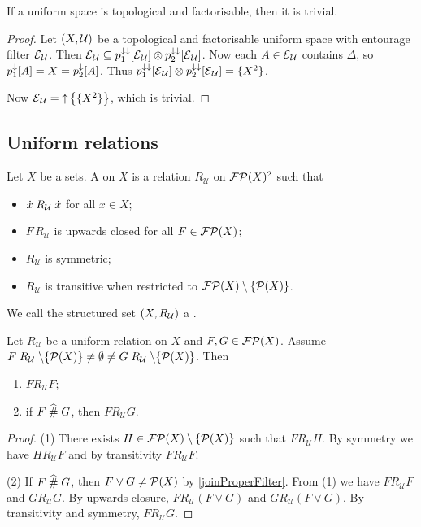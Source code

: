 \begin{proposition}
If a uniform space is topological and factorisable, then it is trivial.
\end{proposition}
\begin{proof}
Let $\left( X,\mathcal{U} \right)$ be a topological and factorisable uniform space with entourage filter $\operatorname{\mathcal{E}}_\mathcal{U}$. Then $\operatorname{\mathcal{E}}_\mathcal{U} \subseteq p_1^{\downarrow\downarrow}[\operatorname{\mathcal{E}}_\mathcal{U}]\otimes p_2^{\downarrow\downarrow}[\operatorname{\mathcal{E}}_\mathcal{U}]$. Now each $A\in \operatorname{\mathcal{E}}_\mathcal{U}$ contains $\Delta$, so $p_1^\downarrow[A] = X = p_2^\downarrow[A]$. Thus $p_1^{\downarrow\downarrow}[\operatorname{\mathcal{E}}_\mathcal{U}]\otimes p_2^{\downarrow\downarrow}[\operatorname{\mathcal{E}}_\mathcal{U}] = \{X^2\}$.

Now $\operatorname{\mathcal{E}}_\mathcal{U} = \operatorname{\uparrow}\big\{\{X^2\}\big\}$, which is trivial.
\end{proof}

\subsection{Uniform relations}
\begin{definition}
Let $X$ be a sets. A  on $X$ is a relation $R_\mathcal{U}$ on $\operatorname{\mathcal{FP}}(X)^2$ such that
\begin{itemize}
\item $\dot{x}\mathrel{R_\mathcal{U}}\dot{x}$ for all $x\in X$;
\item $F\,R_\mathcal{U}$ is upwards closed for all $F\in \operatorname{\mathcal{FP}}(X)$;
\item $R_\mathcal{U}$ is symmetric;
\item $R_\mathcal{U}$ is transitive when restricted to $\operatorname{\mathcal{FP}}(X)\setminus\{\operatorname{\mathcal{P}}(X)\}$.
\end{itemize}
We call the structured set $\left( X,R_\mathcal{U} \right)$ a .
\end{definition}

\begin{lemma} \label{uniformRelationRelatedElementLemma}
Let $R_\mathcal{U}$ be a uniform relation on $X$ and $F,G\in\operatorname{\mathcal{FP}}(X)$. Assume $F\mathrel{R_\mathcal{U}}\setminus\{\operatorname{\mathcal{P}}(X)\} \neq \emptyset \neq G\mathrel{R_\mathcal{U}}\setminus\{\operatorname{\mathcal{P}}(X)\}$. Then
\begin{enumerate}
\item $F\mathrel{R_\mathcal{U}} F$;
\item if $F\mathrel{\widehat{\#}} G$, then $F\mathrel{R_\mathcal{U}} G$.
\end{enumerate}
\end{lemma}
\begin{proof}
(1) There exists $H\in\operatorname{\mathcal{FP}}(X)\setminus\{\operatorname{\mathcal{P}}(X)\}$ such that $F\mathrel{R_\mathcal{U}} H$. By symmetry we have $H\mathrel{R_\mathcal{U}} F$ and by transitivity $F\mathrel{R_\mathcal{U}} F$.

(2) If $F\mathrel{\widehat{\#}} G$, then $F\vee G \neq \operatorname{\mathcal{P}}(X)$ by \ref{joinProperFilter}. From (1) we have $F\mathrel{R_\mathcal{U}} F$ and $G\mathrel{R_\mathcal{U}} G$. By upwards closure, $F\mathrel{R_\mathcal{U}} (F\vee G)$ and $G\mathrel{R_\mathcal{U}} (F\vee G)$. By transitivity and symmetry, $F\mathrel{R_\mathcal{U}} G$.
\end{proof}

